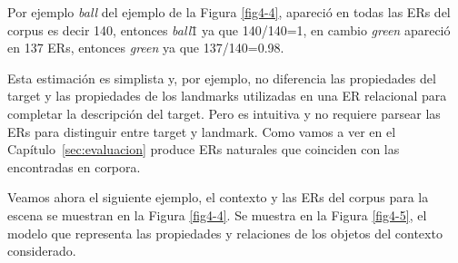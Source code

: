 Por ejemplo {\it ball} del ejemplo de la Figura \ref{fig4-4}, apareci\'o en todas las ERs del corpus es decir 140, entonces {\it ball}\puse\=1 ya que 140/140=1, en cambio {\it green} apareci\'o en 137 ERs, entonces {\it green} ya que 137/140=0.98.

Esta estimaci\'on es simplista y, por ejemplo, no 
diferencia las propiedades del target y las propiedades de
los landmarks utilizadas en una ER relacional para completar la descripci\'on
del target. Pero es intuitiva y no requiere parsear las ERs para distinguir entre target y landmark. Como vamos a ver
en el Cap\'itulo~\ref{sec:evaluacion} produce ERs naturales
que coinciden con las encontradas en corpora.

Veamos ahora el siguiente ejemplo, el contexto y las ERs del corpus para la escena se muestran en la Figura \ref{fig4-4}. Se muestra en la Figura \ref{fig4-5}, el modelo que representa 
las propiedades y relaciones de los objetos del contexto considerado.

